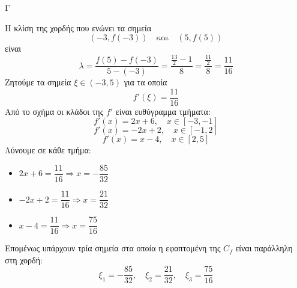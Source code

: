 \begin{thema}{Γ}
\begin{erwthma}
\item Η κλίση της χορδής που ενώνει τα σημεία
\[
(-3,f(-3))
\quad \text{και}\quad
(5,f(5))
\]
είναι
\[
\lambda=\frac{f(5)-f(-3)}{5-(-3)}
=\frac{\frac{13}{2}-1}{8}
=\frac{\frac{11}{2}}{8}
=\frac{11}{16}
\]
Ζητούμε τα σημεία $\xi\in(-3,5)$ για τα οποία
\[
f'(\xi)=\frac{11}{16}
\]
Από το σχήμα οι κλάδοι της $f'$ είναι ευθύγραμμα τμήματα:
\[
f'(x)=2x+6,\quad x\in[-3,-1]
\]
\[
f'(x)=-2x+2,\quad x\in[-1,2]
\]
\[
f'(x)=x-4,\quad x\in[2,5]
\]
Λύνουμε σε κάθε τμήμα:
\begin{itemize}
\item $2x+6=\dfrac{11}{16}\Rightarrow x=-\dfrac{85}{32}$
\item $-2x+2=\dfrac{11}{16}\Rightarrow x=\dfrac{21}{32}$
\item $x-4=\dfrac{11}{16}\Rightarrow x=\dfrac{75}{16}$
\end{itemize}
Επομένως υπάρχουν τρία σημεία στα οποία η εφαπτομένη της $C_f$ είναι παράλληλη στη χορδή:
\[
\xi_1=-\frac{85}{32},\quad
\xi_2=\frac{21}{32},\quad
\xi_3=\frac{75}{16}
\]
\end{erwthma}
\end{thema}

